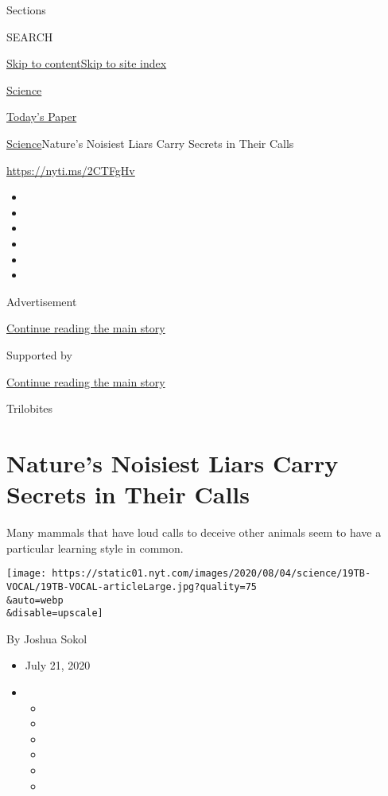 Sections

SEARCH

\protect\hyperlink{site-content}{Skip to
content}\protect\hyperlink{site-index}{Skip to site index}

\href{https://www.nytimes.com/section/science}{Science}

\href{https://myaccount.nytimes.com/auth/login?response_type=cookie\&client_id=vi}{}

\href{https://www.nytimes.com/section/todayspaper}{Today's Paper}

\href{/section/science}{Science}\textbar{}Nature's Noisiest Liars Carry
Secrets in Their Calls

\url{https://nyti.ms/2CTFgHv}

\begin{itemize}
\item
\item
\item
\item
\item
\item
\end{itemize}

Advertisement

\protect\hyperlink{after-top}{Continue reading the main story}

Supported by

\protect\hyperlink{after-sponsor}{Continue reading the main story}

Trilobites

\hypertarget{natures-noisiest-liars-carry-secrets-in-their-calls}{%
\section{Nature's Noisiest Liars Carry Secrets in Their
Calls}\label{natures-noisiest-liars-carry-secrets-in-their-calls}}

Many mammals that have loud calls to deceive other animals seem to have
a particular learning style in common.

\texttt{[image: https://static01.nyt.com/images/2020/08/04/science/19TB-VOCAL/19TB-VOCAL-articleLarge.jpg?quality=75\\\&auto=webp\\\&disable=upscale]}

By Joshua Sokol

\begin{itemize}
\item
  July 21, 2020
\item
  \begin{itemize}
  \item
  \item
  \item
  \item
  \item
  \item
  \end{itemize}
\end{itemize}

